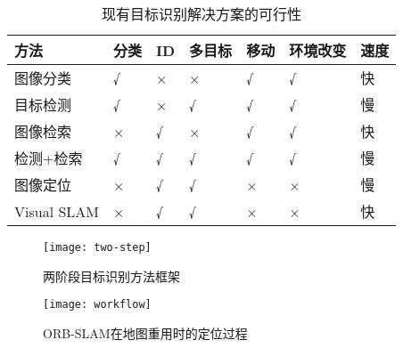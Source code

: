 \begin{table}[htbp]
    \centering
    \caption{\label{table:methods}现有目标识别解决方案的可行性}
    \begin{tabular}{|l|l|l|l|l|l|l|}\hline
    方法 &
      分类 &
      ID &
      多目标 &
      移动 &
      环境改变 &
      速度 \\
      \hline 图像分类\cite{he2019bag} &
      {\color[HTML]{355421} √} &
      {\color[HTML]{BF0000} ×} &
      {\color[HTML]{BF0000} ×} &
      {\color[HTML]{355421} √} &
      {\color[HTML]{355421} √} &
      {\color[HTML]{355421} 快} \\ \hline
    目标检测\cite{zou2019object} &
      {\color[HTML]{355421} √} &
      {\color[HTML]{BF0000} ×} &
      {\color[HTML]{355421} √} &
      {\color[HTML]{355421} √} &
      {\color[HTML]{355421} √} &
      {\color[HTML]{BF0000} 慢} \\ \hline
    图像检索\cite{philbin2008lost,zheng2017sift} &
      {\color[HTML]{BF0000} ×} &
      {\color[HTML]{355421} √} &
      {\color[HTML]{BF0000} ×} &
      {\color[HTML]{355421} √} &
      {\color[HTML]{355421} √} &
      {\color[HTML]{355421} 快} \\ \hline
    检测+检索 &
      {\color[HTML]{355421} √} &
      {\color[HTML]{355421} √} &
      {\color[HTML]{355421} √} &
      {\color[HTML]{355421} √} &
      {\color[HTML]{355421} √} &
      {\color[HTML]{BF0000} 慢} \\ \hline
    图像定位\cite{sattler2011fast} &
      {\color[HTML]{BF0000} ×} &
      {\color[HTML]{355421} √} &
      {\color[HTML]{355421} √} &
      {\color[HTML]{BF0000} ×} &
      {\color[HTML]{BF0000} ×} &
      {\color[HTML]{BF0000} 慢} \\ \hline
    Visual SLAM\cite{liu2021edgesharing} &
      {\color[HTML]{BF0000} ×} &
      {\color[HTML]{355421} √} &
      {\color[HTML]{355421} √} &
      {\color[HTML]{BF0000} ×} &
      {\color[HTML]{BF0000} ×} &
      {\color[HTML]{355421} 快} \\ \hline
    \end{tabular}
    \end{table}

    \begin{figure}[t]
        \centering
        \texttt{[image: two-step]}
        \caption{两阶段目标识别方法框架}
        \label{fig:two-step-workflow}
    \end{figure}

    \begin{figure}[t]
        \centering
        \texttt{[image: workflow]}
        \caption{ORB-SLAM\cite{mur2017orb}在地图重用时的定位过程}
        \label{fig:localization}
    \end{figure}
